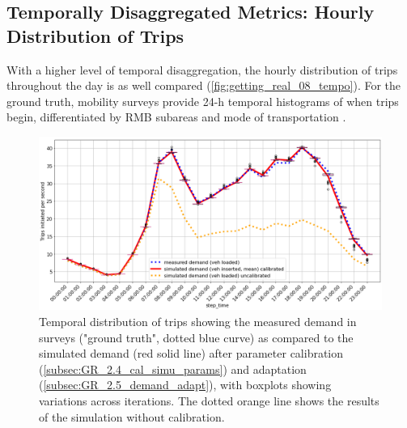\subsection{Temporally Disaggregated Metrics: Hourly Distribution of Trips}

With a higher level of temporal disaggregation, the hourly distribution of trips throughout the day is as well compared (\autoref{fig:getting_real_08_tempo}). For the ground truth, mobility surveys provide 24-h temporal histograms of when trips begin, differentiated by RMB subareas and mode of transportation \citep[page 59]{InstitutdEstudisRegionalsiMetropolitansdeBarcelonaIERMB2020}.

\begin{figure}[htbp!]
    \centering
    \includegraphics[width=1\textwidth]{fig_08.png}
    \caption{Temporal distribution of trips showing the measured demand in surveys ("ground truth", dotted blue curve) as compared to the simulated demand (red solid line) after parameter calibration (\autoref{subsec:GR_2.4_cal_simu_params}) and adaptation (\autoref{subsec:GR_2.5_demand_adapt}), with boxplots showing variations across iterations. The dotted orange line shows the results of the simulation without calibration.}
   \label{fig:getting_real_08_tempo}
\end{figure}

